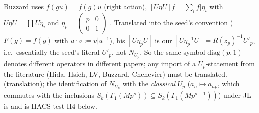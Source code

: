 \begin{remark}\label{rem:s01-Upconv}
Buzzard uses $f(gu)=f(g)u$ (right action), $[U\eta U]f=\sum_if|\eta_i$ with $U\eta U=\coprod U\eta_i$ and $\eta_p=\left(\begin{smallmatrix}p&0\\0&1\end{smallmatrix}\right)$
. Translated into the seed's
convention ($F(g)=f(g)$ with $u\cdot v:=v|u^{-1}$), his $[U\eta_pU]$ is our $[U\eta_p^{-1}U]=R(z_p)^{-1}U'_p$, i.e.\ essentially the
seed's literal $U'_p$, not $N_{U_p}$. So the same symbol $\mathrm{diag}(p,1)$ denotes different operators in different papers;
any import of a $U_p$-statement from the literature (Hida, Hsieh, LV, Buzzard, Chenevier) must be translated. \sttoprove{}
(translation); the identification of $N_{U_p}$ with the \emph{classical} $U_p$ ($a_n\mapsto a_{np}$, which commutes with the
inclusions $S_k(\Gamma_1(Mp^s))\subseteq S_k(\Gamma_1(Mp^{s+1}))$) under JL is \stexp{} and is HACS test H4 below.
\end{remark}

